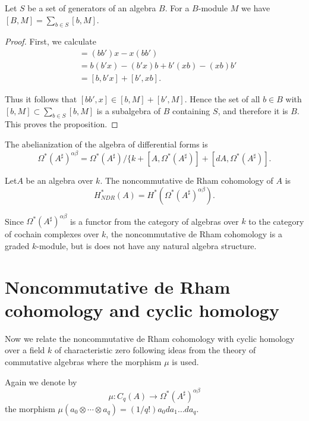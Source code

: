 \begin{proposition}\label{chap7-prop2.6}
Let $S$ be a set of generators of an algebra $B$. For a $B$-module $M$
we have $[B,M]=\displaystyle{\sum_{b\in S}[b,M]}$. 
\end{proposition}

\begin{proof}
First, we calculate
\begin{align*}
[bb',x]&=(bb')x-x(bb')\\
&=b(b'x)-(b'x)b+b'(xb)-(xb)b'\\
&=[b,b'x]+[b',xb]. 
\end{align*}

Thus it follows that $[bb',x]\in [b,M]+[b',M]$. Hence the set of all
$b\in B$ with $\displaystyle{[b,M]\subset \sum_{b\in S}[b,M]}$ is a subalgebra of $B$
containing $S$, and therefore it is $B$. This proves the proposition.
\end{proof}

\begin{corollary}\label{chap7-coro2.7}
The abelianization of the algebra of differential forms is
$$
\Omega^{*}(A^{\sharp})^{\alpha\beta}=\Omega^{*}(A^{\sharp})/\{k+[A,\Omega^{*}(A^{\sharp})]+[dA,\Omega^{*}(A^{\sharp})]. 
$$
\end{corollary}

\begin{definition}\label{chap7-defi2.8}
Let\pageoriginale $A$ be an algebra over $k$. The noncommutative de
Rham cohomology of $A$ is
$$
H^{*}_{NDR}(A)=H^{*}(\Omega^{*}(A^{\sharp})^{\alpha\beta}).
$$

Since $\Omega^{*}(A^{\sharp})^{\alpha\beta}$ is a functor from the
category of algebras over $k$ to the category of cochain complexes
over $k$, the noncommutative de Rham cohomology is a graded
$k$-module, but is does not have any natural algebra structure.
\end{definition}

\section[Noncommutative de Rham cohomology and...]{Noncommutative de
  Rham cohomology and cyclic 
  homology}\label{chap7-sec3} 

Now we relate the noncommutative de Rham cohomology with cyclic
homology over a field $k$ of characteristic zero following ideas from
the theory of commutative algebras where the morphism $\mu$ is used.

\begin{notation}\label{chap7-not3.1}
Again we denote by
$$
\mu:C_{q}(A)\to \Omega^{*}(A^{\sharp})^{\alpha\beta}
$$
the morphism $\mu(a_{0}\otimes\cdots\otimes
a_{q})=(1/q!)a_{0}da_{1}\ldots da_{q}$. 
\end{notation}

